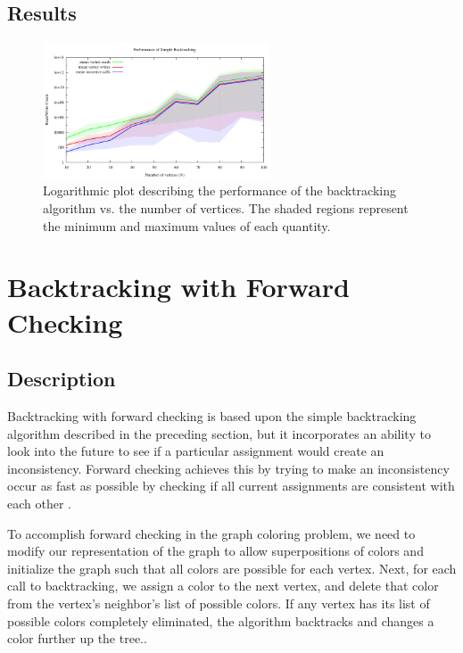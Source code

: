 \documentclass{article}
\begin{document}
	
	\subsection{Results}
		
		\begin{figure}[h!]
			\centering
			\includegraphics[width=0.6\textwidth]{../results_5/backtracking_simple/bt_simple_performance}
			\caption{Logarithmic plot describing the performance of the backtracking algorithm vs. the number of vertices. The shaded regions represent the minimum and maximum values of each quantity.}
		\end{figure}
	
\section{Backtracking with Forward Checking}

	\subsection{Description}
	
		Backtracking with forward checking is based upon the simple backtracking algorithm described in the preceding section, but it incorporates an ability to look into the future to see if a particular assignment would create an inconsistency. Forward checking achieves this by trying to make an inconsistency occur as fast as possible by checking if all current assignments are consistent with each other \cite{haralick}.
		
		To accomplish forward checking in the graph coloring problem, we need to modify our representation of the graph to allow superpositions of colors and initialize the graph such that all colors are possible for each vertex. Next, for each call to backtracking, we assign a color to the next vertex, and delete that color from the vertex's neighbor's list of possible colors. If any vertex has its list of possible colors completely eliminated, the algorithm backtracks and changes a color further up the tree.\cite{ai}.
		
\end{document}
